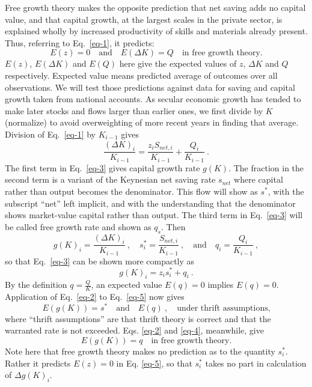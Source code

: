 \documentclass[a4paper,fleqn]{latex_styles/cas-sc}
\begin{document}
Free growth theory makes the opposite prediction that net saving adds no capital value, and that capital growth, at the largest scales in the private sector, is explained wholly by increased productivity of skills and materials already present. Thus, referring to Eq.~\eqref{eq-1}, it predicts:
%
\begin{equation}
    E(z) = 0 \quad \text{and} \quad E(\Delta K) = Q \quad \text{in free growth theory.} \label{eq-3}
\end{equation}
%
\(E(z)\), \(E(\Delta K)\) and \(E(Q)\) here give the expected values of \(z\), \(\Delta K\)
and \(Q\) respectively. Expected value means predicted average of outcomes
over all observations.
We will test those predictions against data for saving and capital growth taken from national accounts.
As secular economic growth has tended to make
later stocks and flows larger than earlier ones, we first divide by
\(K\) (normalize) to avoid overweighting of more recent years in finding
that average. Division of Eq.~\eqref{eq-1} by \(K_{i - 1}\) gives
%
\begin{equation}
    \frac{(\Delta K)_{i}}{K_{i - 1}} = \frac{z_i S_{net,i}}{K_{i - 1}} + \frac{Q_{i}}{K_{i - 1}} \ .\label{eq-4}
\end{equation}
%
The first term in Eq.~\eqref{eq-3} gives capital growth rate \(g(K)\). The fraction in the second term is a
variant of the Keynesian net saving rate \(s_{net}\) where capital
rather than output becomes the denominator. This flow will show 
as \(s^{*}\), with the subscript ``net''
left implicit, and with the understanding that the denominator shows
market-value capital rather than output.
The third term in Eq.~\eqref{eq-3} will be called free growth rate and
shown as \(q_s\). Then
%
\[g{(K)}_{i} = \frac{(\Delta K)_{i}}{K_{i - 1}} \ , \quad
s^{*}_{i} = \frac{S_{net,i}}{K_{i - 1}} \ , \quad \text{and} \quad
q_{i} = \frac{Q_{i}}{K_{i - 1}} \ ,\]
%
so that Eq.~\eqref{eq-3} can be shown more compactly as
%
\begin{equation}
g(K)_{i} = z_i s^{*}_{i} + q_{i} \ .\label{eq-5}
\end{equation}
%
By the definition \(q = \frac{Q}{K}\), an expected value \(E(q) = 0\)
implies \(E(q) = 0\). Application of Eq.~\eqref{eq-2} to
Eq.~\eqref{eq-5} now gives
%
\begin{equation}
    E(g(K)) = s^* \quad \text{and} \quad E(q)\ , \quad \text{under thrift assumptions,}\label{eq-6}
\end{equation}
%
where ``thrift assumptions'' are that thrift theory is correct and that
the warranted rate is not exceeded. Eqs. \eqref{eq-2} and \eqref{eq-4}, meanwhile, give
%
\begin{equation}
    E(g(K)) = q \quad \text{in free growth theory.}\label{eq-7}
\end{equation}
%
Note here that free growth theory makes no prediction as to the quantity \(s^*_i\). Rather it predicts \(E(z)=0\) in Eq. \eqref{eq-5}, so that \(s^*_i\) takes no part in calculation of \(\Delta g(K)_i\). 
\end{document}
